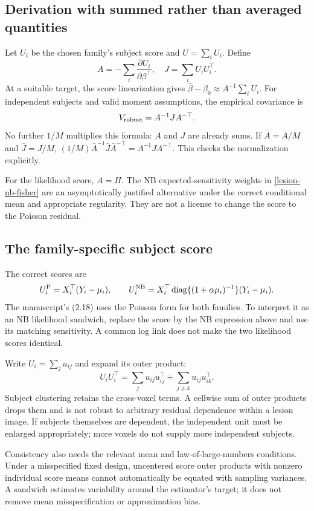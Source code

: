 \documentclass[11pt,a4paper]{article}
\newcommand{\diag}{\operatorname{diag}}
\numberwithin{equation}{section}
\begin{document}
\subsection{Derivation with summed rather than averaged quantities}
Let $U_i$ be the chosen family's subject score and
$U=\sum_iU_i$. Define
\[
 A=-\sum_i\frac{\partial U_i}{\partial\beta^\top},\quad
 J=\sum_iU_iU_i^\top.
\]
At a suitable target, the score linearization gives
$\widehat\beta-\beta_0\approx A^{-1}\sum_iU_i$.
For independent subjects and valid moment assumptions, the empirical
covariance is
\begin{equation}\label{lesion-sandwich-formula}
 V_{\rm robust}=A^{-1}JA^{-\top}.
\end{equation}
No further $1/M$ multiplies this formula: $A$ and $J$ are
already sums. If $\bar A=A/M$ and $\bar J=J/M$,
$(1/M)\bar A^{-1}\bar J\bar A^{-\top}=A^{-1}JA^{-\top}$.
This checks the normalization explicitly.

For the likelihood score, $A=H$.
The NB expected-sensitivity weights in
\eqref{lesion-nb-fisher} are an asymptotically justified alternative
under the correct conditional mean and appropriate regularity.
They are not a license to change the score to the Poisson residual.

\subsection{The family-specific subject score}
The correct scores are
\[
 U_i^{\rm P}=X_i^\top(Y_i-\mu_i),\qquad
 U_i^{\rm NB}
 =X_i^\top\diag\{(1+\alpha\mu_i)^{-1}\}(Y_i-\mu_i).
\]
The manuscript's (2.18) uses the Poisson form for both families.
To interpret it as an NB likelihood sandwich, replace the score
by the NB expression above and use its matching sensitivity.
A common log link does not make the two likelihood scores identical.

Write $U_i=\sum_j u_{ij}$ and expand its outer product:
\[
 U_iU_i^\top
 =\sum_j u_{ij}u_{ij}^\top+
                  \sum_{j\ne k}u_{ij}u_{ik}^\top.
\]
Subject clustering retains the cross-voxel terms.
A cellwise sum of outer products drops them and is not robust
to arbitrary residual dependence within a lesion image.
If subjects themselves are dependent, the independent unit must
be enlarged appropriately; more voxels do not supply more
independent subjects.

Consistency also needs the relevant mean and law-of-large-numbers
conditions. Under a misspecified fixed design, uncentered score
outer products with nonzero individual score means cannot
automatically be equated with sampling variances.
A sandwich estimates variability around the estimator's target;
it does not remove mean misspecification or approximation bias.
\end{document}
